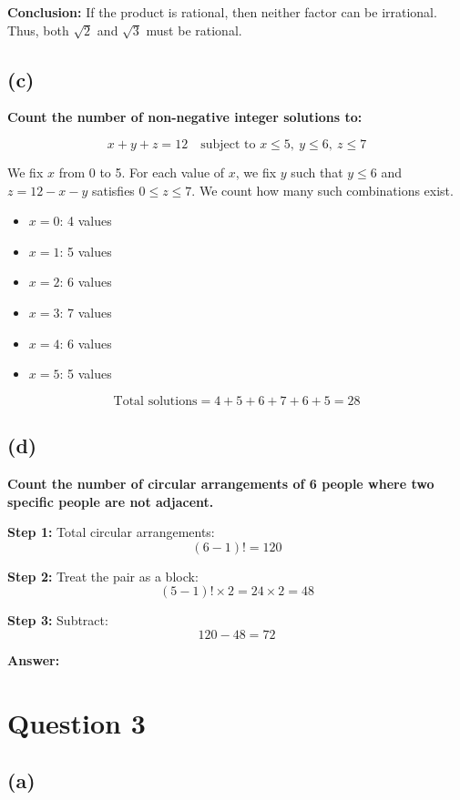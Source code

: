 \documentclass{article}
\begin{document}
\textbf{Conclusion:} If the product is rational, then neither factor can be irrational.  
Thus, both \(\sqrt{2}\) and \(\sqrt{3}\) must be rational.

\subsection*{(c)}

\textbf{Count the number of non-negative integer solutions to:}

\[
x + y + z = 12 \quad \text{subject to } x \leq 5,\ y \leq 6,\ z \leq 7
\]

We fix \(x\) from 0 to 5. For each value of \(x\), we fix \(y\) such that \(y \leq 6\) and \(z = 12 - x - y\) satisfies \(0 \leq z \leq 7\). We count how many such combinations exist.

\begin{itemize}
  \item \(x = 0\): 4 values
  \item \(x = 1\): 5 values
  \item \(x = 2\): 6 values
  \item \(x = 3\): 7 values
  \item \(x = 4\): 6 values
  \item \(x = 5\): 5 values
\end{itemize}

\[
\text{Total solutions} = 4 + 5 + 6 + 7 + 6 + 5 = \boxed{28}
\]

\subsection*{(d)}

\textbf{Count the number of circular arrangements of 6 people where two specific people are not adjacent.}

\textbf{Step 1:} Total circular arrangements:
\[
(6 - 1)! = 120
\]

\textbf{Step 2:} Treat the pair as a block:
\[
(5 - 1)! \times 2 = 24 \times 2 = 48
\]

\textbf{Step 3:} Subtract:
\[
120 - 48 = \boxed{72}
\]

\textbf{Answer:} 

\section*{Question 3}

\subsection*{(a)}
\end{document}
